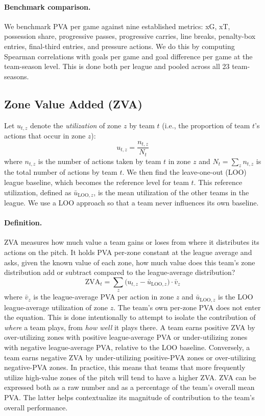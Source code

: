 \documentclass[12pt,a4paper]{article}
\begin{document}
\paragraph{Benchmark comparison.}
We benchmark PVA per game against nine established metrics: xG, xT, possession share, progressive passes, progressive carries, line breaks, penalty-box entries, final-third entries, and pressure actions. We do this by computing Spearman correlations with goals per game and goal difference per game at the team-season level. This is done both per league and pooled across all 23 team-seasons.


\subsection{Zone Value Added (ZVA)}

Let $u_{t,z}$ denote the \emph{utilization} of zone $z$ by team $t$ (i.e., the proportion of team $t$’s actions that occur in zone $z$):
\begin{equation}
u_{t,z}
=
\frac{n_{t,z}}{N_t}
\end{equation}
where $n_{t,z}$ is the number of actions taken by team $t$ in zone $z$ and $N_t = \sum_z n_{t,z}$ is the total number of actions by team $t$. We then find the leave-one-out (LOO) league baseline, which becomes the reference level for team $t$. This reference utilization, defined as $\bar{u}_{\text{LOO},z}$, is the mean utilization of the other teams in the league. We use a LOO approach so that a team never influences its own baseline.

\paragraph{Definition.}
ZVA measures how much value a team gains or loses from where it distributes its actions on the pitch. It holds PVA per-zone constant at the league average and asks, given the known value of each zone, how much value does this team’s zone distribution add or subtract compared to the league-average distribution?
\begin{equation}
\text{ZVA}_t = \sum_{z} \bigl(u_{t,z} - \bar{u}_{\text{LOO},z}\bigr) \cdot \bar{v}_z
\end{equation}
where $\bar{v}_z$ is the league-average PVA per action in zone $z$ and $\bar{u}_{\text{LOO},z}$ is the LOO league-average utilization of zone $z$. The team’s own per-zone PVA does not enter the equation. This is done intentionally to attempt to isolate the contribution of \emph{where} a team plays, from \emph{how well} it plays there. A team earns positive ZVA by over-utilizing zones with positive league-average PVA or under-utilizing zones with negative league-average PVA, relative to the LOO baseline. Conversely, a team earns negative ZVA by under-utilizing positive-PVA zones or over-utilizing negative-PVA zones. In practice, this means that teams that more frequently utilize high-value zones of the pitch will tend to have a higher ZVA. ZVA can be expressed both as a raw number and as a percentage of the team’s overall mean PVA. The latter helps contextualize its magnitude of contribution to the team’s overall performance.
\end{document}
